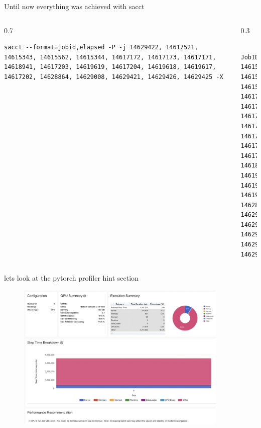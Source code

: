 \documentclass[compress,aspectratio=169]{beamer}
\begin{document}
\begin{frame}[fragile]{Until now everything was achieved with sacct}
\begin{columns}
\begin{column}{0.7\textwidth}
        \begin{verbatim}
sacct --format=jobid,elapsed -P -j 14629422, 14617521, 14615343, 14615562, 14615344, 14617172, 14617173, 14617171, 14618941, 14617203, 14619619, 14617204, 14619618, 14619617, 14617202, 14628864, 14629008, 14629421, 14629426, 14629425 -X
        \end{verbatim}
\end{column}

\begin{column}{0.3\textwidth}
    \vspace{-2em}
        \begin{verbatim}
    JobID|Elapsed
14615343|00:11:10
14615344|00:11:22
14615562|00:04:48
14617171|00:06:28
14617172|00:06:22
14617173|00:03:36
14617202|00:04:24
14617203|00:04:19
14617204|00:04:31
14617521|00:01:40
14618941|00:20:02
14619617|00:13:25
14619618|00:08:40
14619619|00:04:06
14628864|01:07:19
14629008|00:06:45
14629421|02:37:14
14629422|01:10:40
14629425|00:13:55
14629426|02:36:55
        \end{verbatim}
\end{column}
\end{columns}

\end{frame}

\begin{frame}{lets look at the pytorch profiler hint section}
	\vspace{-1em}
\begin{center}
    \begin{figure}
        \includegraphics[width=0.9\textwidth]{../../data/scap_gtx1080_profiler-torch_14650076}
    \end{figure}
\end{center}

\end{frame}
\end{document}
